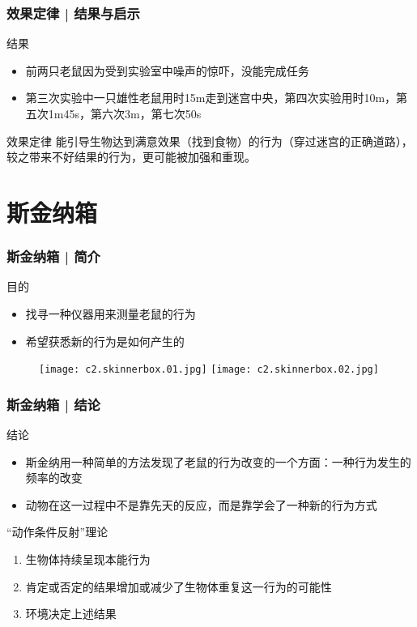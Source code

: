 \begin{frame}
  \frametitle{效果定律 | 结果与启示}
  \begin{block}{结果}
    \begin{itemize}
      \item 前两只老鼠因为受到实验室中噪声的惊吓，没能完成任务
      \item 第三次实验中一只雄性老鼠用时15m走到迷宫中央，第四次实验用时10m，第五次1m45s，第六次3m，第七次50s
    \end{itemize}
  \end{block}
  \pause
  \begin{block}{效果定律}
    能引导生物达到满意效果（找到食物）的行为（穿过迷宫的正确道路），较之带来不好结果的行为，更可能被加强和重现。
  \end{block}
\end{frame}

\section{斯金纳箱}
\begin{frame}
  \frametitle{斯金纳箱 | 简介}
  \begin{block}{目的}
    \begin{itemize}
      \item 找寻一种仪器用来测量老鼠的行为
      \item 希望获悉新的行为是如何产生的
    \end{itemize}
  \end{block}
  \begin{figure}
    \centering
    \texttt{[image: c2.skinnerbox.01.jpg]}
    \texttt{[image: c2.skinnerbox.02.jpg]}
  \end{figure}
\end{frame}

\begin{frame}
  \frametitle{斯金纳箱 | 结论}
  \begin{block}{结论}
    \begin{itemize}
      \item 斯金纳用一种简单的方法发现了老鼠的行为改变的一个方面：一种行为发生的频率的改变
      \item 动物在这一过程中不是靠先天的反应，而是靠学会了一种新的行为方式
    \end{itemize}
  \end{block}
  \pause
  \begin{block}{“动作条件反射”理论}
    \begin{enumerate}
      \item 生物体持续呈现本能行为
      \item 肯定或否定的结果增加或减少了生物体重复这一行为的可能性
      \item 环境决定上述结果
    \end{enumerate}
  \end{block}
\end{frame}

